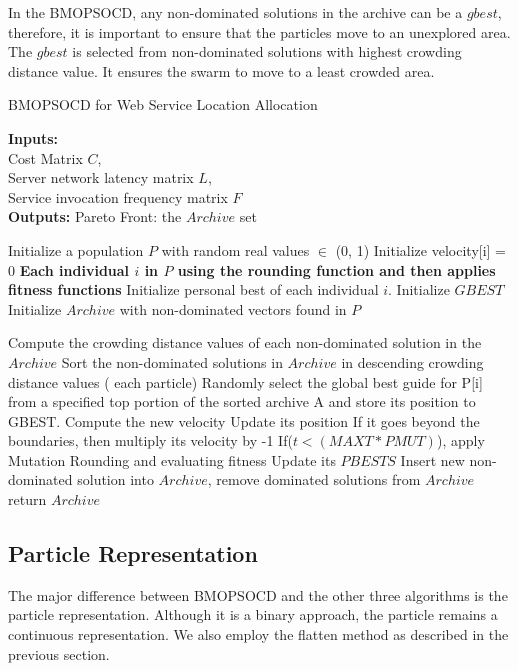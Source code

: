In the BMOPSOCD, any non-dominated solutions in the archive can be a $gbest$, therefore, it is important to ensure that the particles move to an unexplored area. The $gbest$ is selected from non-dominated solutions with highest crowding distance value. It ensures the swarm to move to a least crowded area.

\begin{algorithm}[!htb]
	\caption{BMOPSOCD for Web Service Location Allocation}
	\footnotesize
	\textbf{Inputs:} \\
		Cost Matrix $C$, \\
		Server network latency matrix $L$, \\
		Service invocation frequency matrix $F$ \\
	\textbf{Outputs:}
		Pareto Front: the $Archive$ set

	\begin{algorithmic}[1]
		\State Initialize a population $P$ with random real values $\in$ (0, 1)
		\State Initialize velocity[i] = 0
		\State \textbf{Each individual $i$ in $P$ using the rounding function and then applies fitness functions}
		\State Initialize personal best of each individual $i$.
		\State Initialize $GBEST$
		\State Initialize $Archive$ with non-dominated vectors found in $P$

		\Repeat
			\State Compute the crowding distance values of each non-dominated solution in the $Archive$
			\State Sort the non-dominated solutions in $Archive$ in descending crowding distance values
			\For ( each particle)
				\State Randomly select the global best guide for P[i] from a specified top portion of the sorted archive A and store its position to GBEST.
				\State Compute the new velocity 
				\State Update its position
				\State If it goes beyond the boundaries, then multiply its velocity by -1
				\State If($t < (MAXT * PMUT)$), apply Mutation
				\State Rounding and evaluating fitness
				\State Update its $PBESTS$
				\EndFor
		\State Insert new non-dominated solution into $Archive$, remove dominated solutions from $Archive$
		\State return $Archive$
	\end{algorithmic}
	\label{alg:BMOPSOCD}
\end{algorithm}

\subsection{Particle Representation}
The major difference between BMOPSOCD and the other three algorithms is the particle representation. 
Although it is a binary approach, the particle remains a continuous representation.
We also employ the flatten method as described in the previous section.

